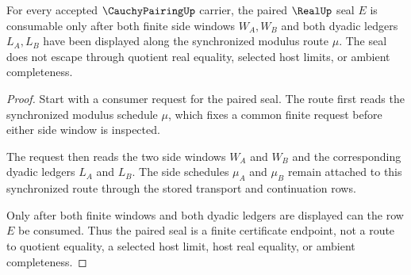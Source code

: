 \begin{theorem}
\label{thm:cauchy-pairing-paired-seal-non-escape}
For every accepted $\CauchyPairingUp$ carrier, the paired $\RealUp$ seal $E$ is consumable only after both finite side windows $W_A,W_B$ and both dyadic ledgers $L_A,L_B$ have been displayed along the synchronized modulus route $\mu$. The seal does not escape through quotient real equality, selected host limits, or ambient completeness.
\end{theorem}
\begin{proof}
Start with a consumer request for the paired seal. The route first reads the synchronized modulus schedule $\mu$, which fixes a common finite request before either side window is inspected.

The request then reads the two side windows $W_A$ and $W_B$ and the corresponding dyadic ledgers $L_A$ and $L_B$. The side schedules $\mu_A$ and $\mu_B$ remain attached to this synchronized route through the stored transport and continuation rows.

Only after both finite windows and both dyadic ledgers are displayed can the row $E$ be consumed. Thus the paired seal is a finite certificate endpoint, not a route to quotient equality, a selected host limit, host real equality, or ambient completeness.
\end{proof}

